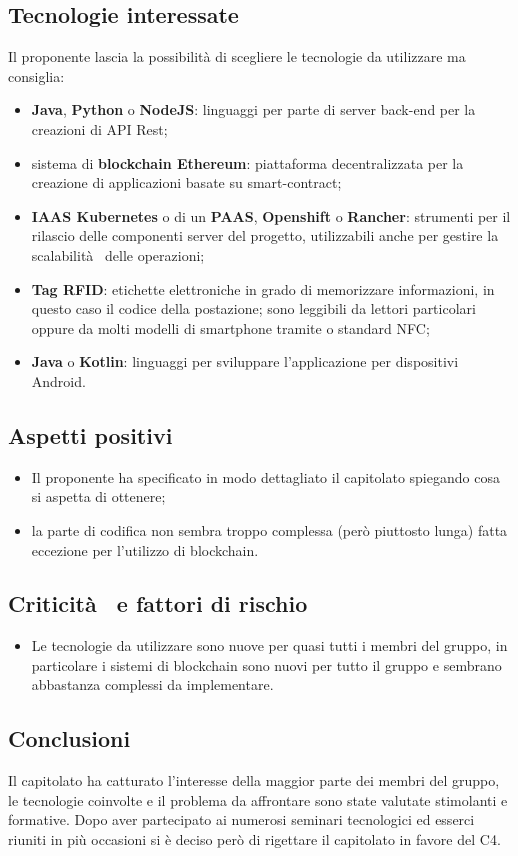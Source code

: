 \subsection{Tecnologie interessate}
Il proponente lascia la possibilità di scegliere le tecnologie da utilizzare ma consiglia:
\begin{itemize}
    \item \textbf{Java}, \textbf{Python} o \textbf{NodeJS}: linguaggi per parte di server back-end per la creazioni di API Rest;
    \item sistema di \textbf{blockchain Ethereum}: piattaforma decentralizzata per la creazione di applicazioni basate su smart-contract;
    \item \textbf{IAAS Kubernetes} o di un \textbf{PAAS}, \textbf{Openshift} o \textbf{Rancher}: strumenti per il rilascio delle componenti server del progetto, utilizzabili anche per gestire la scalabilità  delle operazioni;
    \item \textbf{Tag RFID}: etichette elettroniche in grado di memorizzare informazioni, in questo caso il codice della postazione; sono leggibili da lettori particolari oppure da molti modelli di smartphone tramite o standard NFC;
    \item \textbf{Java} o \textbf{Kotlin}: linguaggi per sviluppare l'applicazione per dispositivi Android.
\end{itemize}
\subsection{Aspetti positivi}
\begin{itemize}
    \item Il proponente ha specificato in modo dettagliato il capitolato spiegando cosa si aspetta di ottenere;
    \item la parte di codifica non sembra troppo complessa (però piuttosto lunga) fatta eccezione per l'utilizzo di blockchain.
\end{itemize}
\subsection{Criticità  e fattori di rischio}
\begin{itemize}
    \item Le tecnologie da utilizzare sono nuove per quasi tutti i membri del gruppo, in particolare i sistemi di blockchain sono nuovi per tutto il gruppo e sembrano abbastanza complessi da implementare.
\end{itemize}
\subsection{Conclusioni}
Il capitolato ha catturato l'interesse della maggior parte dei membri del gruppo, le tecnologie coinvolte e il problema da affrontare sono state valutate stimolanti e formative.
Dopo aver partecipato ai numerosi seminari tecnologici ed esserci riuniti in più occasioni si è deciso però di rigettare il capitolato in favore del C4.
